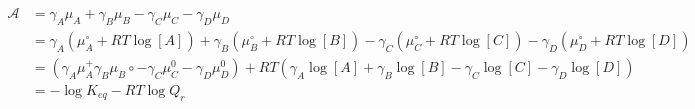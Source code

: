 \begin{eqnarray}\label{eqn:reaction-affinity-chemical-potential}
\mathcal{A} & ={{\gamma }_{A}}{{\mu }_{A}}+{{\gamma }_{B}}{{\mu }_{B}}-{{\gamma }_{C}}{{\mu }_{C}}-{{\gamma }_{D}}{{\mu }_{D}} \\
& = {{\gamma }_{A}}(\mu_A^\circ + RT\log [A])+{{\gamma }_{B}}(\mu_B^\circ + RT\log [B])-{{\gamma }_{C}}(\mu_C^\circ + RT\log [C])-{{\gamma }_{D}}(\mu_D^\circ + RT\log [D]) \\
& = (\gamma_A\mu_A^ + \gamma_B\mu_B\circ -\gamma_C\mu_C^0 -\gamma_D\mu_D^0) + RT\left(\gamma_A\log [A] + \gamma_B\log [B] - \gamma_C\log [C] - \gamma_D\log [D]\right) \\
& = -\log K_{eq} - RT\log Q_r \\
\end{eqnarray}
